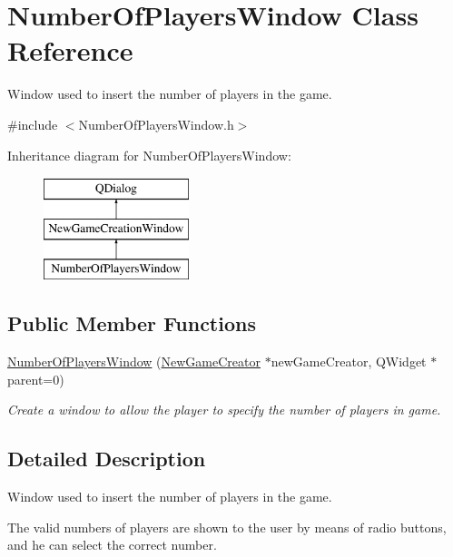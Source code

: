 \hypertarget{classNumberOfPlayersWindow}{}\section{Number\+Of\+Players\+Window Class Reference}
\label{classNumberOfPlayersWindow}


Window used to insert the number of players in the game.  




{\ttfamily \#include $<$Number\+Of\+Players\+Window.\+h$>$}

Inheritance diagram for Number\+Of\+Players\+Window\+:\begin{figure}[H]
\begin{center}
\leavevmode
\includegraphics[height=3.000000cm]{classNumberOfPlayersWindow}
\end{center}
\end{figure}
\subsection*{Public Member Functions}
\begin{DoxyCompactItemize}
\item 
\hyperlink{classNumberOfPlayersWindow_a522ce7de553a78ef1514cc988abb8d38}{Number\+Of\+Players\+Window} (\hyperlink{classNewGameCreator}{New\+Game\+Creator} $\ast$new\+Game\+Creator, Q\+Widget $\ast$parent=0)
\begin{DoxyCompactList}\small\item\em Create a window to allow the player to specify the number of players in game. \end{DoxyCompactList}\end{DoxyCompactItemize}


\subsection{Detailed Description}
Window used to insert the number of players in the game. 

The valid numbers of players are shown to the user by means of radio buttons, and he can select the correct number. 

